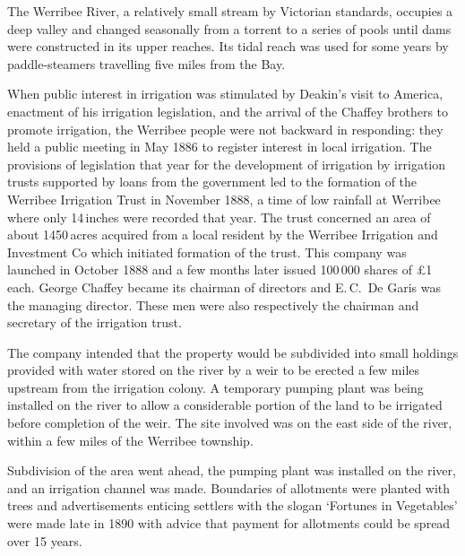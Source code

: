 The Werribee River, a relatively small stream by Victorian standards,
occupies a deep valley and changed seasonally from a torrent to a
series of pools until dams were constructed in its upper reaches.  Its
tidal reach was used for some years by paddle-steamers
 travelling five miles from the Bay.

When public interest in irrigation was stimulated by Deakin's visit to
America, enactment of his irrigation legislation, and
the arrival of the Chaffey brothers to promote irrigation, the
Werribee people were not backward in responding: they held a public
meeting in May 1886 to register interest in local irrigation.  The
provisions of legislation that year for the development of irrigation
by irrigation trusts supported by loans from the government led to the
formation of the Werribee Irrigation Trust in November 1888, a time of
low rainfall at Werribee where only 14\,inches were recorded that
year.  The trust concerned an area of about 1450\,acres acquired from
a local resident by the Werribee Irrigation and Investment Co
 which initiated
formation of the trust.  This company was launched in October 1888 and
a few months later issued 100\,000 shares of \pounds1 each.  George
Chaffey   became its chairman of directors and
E.\,C.~De Garis  was the managing director.
These men were also respectively the chairman and secretary of the
irrigation trust.

The company intended that the property would be subdivided into small
holdings provided with water stored on the river by a weir to be
erected a few miles upstream from the irrigation colony.  A temporary
pumping plant was being installed on the river to allow a considerable
portion of the land to be irrigated before completion of the weir.
The site involved was on the east side of the river, within a few
miles of the Werribee township.

Subdivision of the area went ahead, the pumping plant was installed on
the river, and an irrigation
channel was made.  Boundaries of
allotments were planted with trees and advertisements enticing
settlers with the slogan `Fortunes in Vegetables' were made late in
1890 with advice that payment for allotments could be spread over 15
years.

